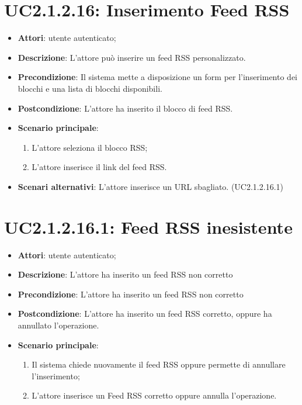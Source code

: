 \section{UC2.1.2.16: Inserimento Feed RSS}
\label{UC2.1.2.16}
\begin{itemize}
	\item \textbf{Attori}: utente autenticato;
	\item \textbf{Descrizione}: L'attore può inserire un feed RSS personalizzato.
	\item \textbf{Precondizione}: Il sistema mette a disposizione un form per l'inserimento dei blocchi e una lista di blocchi disponibili.
	\item \textbf{Postcondizione}: L'attore ha inserito il blocco di feed RSS.
	\item \textbf{Scenario principale}:
	\begin{enumerate} \item L'attore seleziona il blocco RSS;  \item  L'attore inserisce il link del feed RSS.\end{enumerate}
	\item \textbf{Scenari alternativi}:
	L'attore inserisce un URL sbagliato. (UC2.1.2.16.1)
\end{itemize}

\section{UC2.1.2.16.1: Feed RSS inesistente}
\label{UC2.1.2.16.1}
\begin{itemize}
	\item \textbf{Attori}: utente autenticato;
	\item \textbf{Descrizione}: L'attore ha inserito un feed RSS non corretto
	\item \textbf{Precondizione}: L'attore ha inserito un feed RSS non corretto
	\item \textbf{Postcondizione}: L'attore ha inserito un feed RSS corretto, oppure ha annullato l'operazione.
	\item \textbf{Scenario principale}:
	\begin{enumerate} \item Il sistema chiede nuovamente il feed RSS oppure permette di annullare l'inserimento;  \item  L'attore inserisce un Feed RSS corretto oppure annulla l'operazione.\end{enumerate}
\end{itemize}

